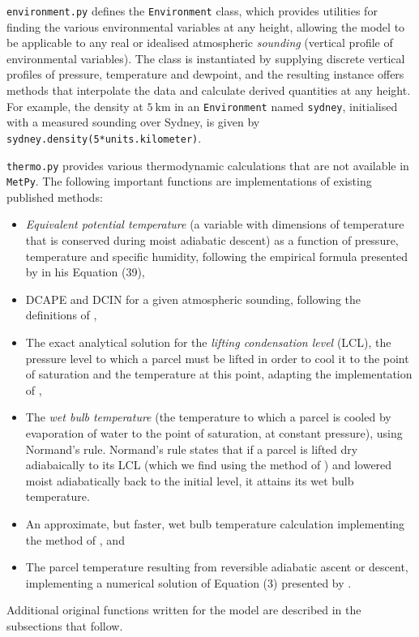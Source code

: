 \documentclass[12pt,titlepage]{article}
\begin{document}
\verb|environment.py| defines the \verb|Environment| class, which
provides utilities for finding the various environmental variables
at any height, allowing the model to be applicable to any real or
idealised atmospheric \emph{sounding} (vertical profile of environmental
variables). The class is instantiated by supplying discrete vertical
profiles of pressure, temperature and dewpoint, and the resulting
instance offers methods that interpolate the data and calculate
derived quantities at any height. For example, the density at
$\SI{5}{\kilo\meter}$ in an \verb|Environment| named \verb|sydney|,
initialised with a measured sounding over Sydney, is given by
\verb|sydney.density(5*units.kilometer)|.

\verb|thermo.py| provides various thermodynamic calculations that
are not available in \verb|MetPy|. The following important functions are
implementations of existing published methods:
\begin{itemize}
	\item \emph{Equivalent potential temperature} (a variable with
		dimensions of temperature that is conserved during moist
		adiabatic descent) as a function of pressure,
		temperature and specific humidity, following the empirical
		formula presented by \textcite{bolton_1980} in his Equation
		(39),
	\item DCAPE and DCIN for a given atmospheric sounding, following
		the definitions of \textcite{market_2017},
	\item The exact analytical solution for the \emph{lifting
		condensation level} (LCL), the pressure level to which a parcel must
		be lifted in order to cool it to the point of saturation and
		the temperature at this point, adapting the implementation
		of \textcite{romps_2017},
	\item The \emph{wet bulb temperature} (the temperature to which
		a parcel is cooled by evaporation of water to the point of
		saturation, at constant pressure), using Normand's rule.
		Normand's rule states that if a parcel is lifted dry
		adiabaically to its LCL (which we find using the method of
		\textcite{romps_2017}) and lowered moist adiabatically back
		to the initial level, it attains its wet bulb temperature.
	\item An approximate, but faster, wet bulb temperature calculation
		implementing the method of \textcite{davies-jones_2008}, and
	\item The parcel temperature resulting from reversible adiabatic
		ascent or descent, implementing a numerical solution of
		Equation (3) presented by \textcite{saunders_1957}.
\end{itemize}
Additional original functions written for the model are described
in the subsections that follow.
\end{document}
